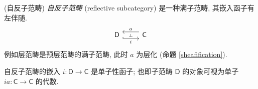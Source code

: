 \begin{example}
	[label={reflective-subcategory}]
	{(自反子范畴)}
	\emph{自反子范畴} (reflective subcategory) 是一种满子范畴, 其嵌入函子有左伴随.
	\[\begin{tikzcd}[ampersand replacement=\&]
		{\mathsf D} \& {\mathsf C}
		\arrow[""{name=0, anchor=center, inner sep=0}, "i"', shift right=2, hook, from=1-1, to=1-2]
		\arrow[""{name=1, anchor=center, inner sep=0}, "a"', shift right=2, from=1-2, to=1-1]
		\arrow["\dashv"{anchor=center, rotate=-90}, draw=none, from=1, to=0]
	\end{tikzcd}\]
	例如层范畴是预层范畴的满子范畴, 此时 $a$ 为层化 (命题 \ref{sheafification}).
	
	自反子范畴的嵌入 $i\colon \mathsf D\to\mathsf C$ 是单子性函子; 也即子范畴 $\mathsf D$ 的对象可视为单子 $ia\colon \mathsf C\to\mathsf C$ 的代数.
\end{example}


